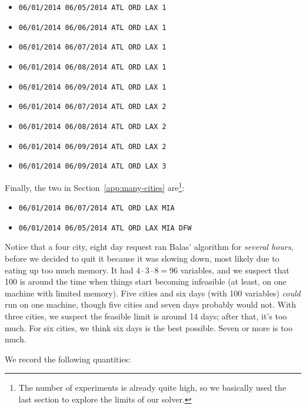 \documentclass{article}
\begin{document}
\begin{itemize}[noitemsep]
    \item \texttt{06/01/2014 06/05/2014 ATL ORD LAX 1}
    \item \texttt{06/01/2014 06/06/2014 ATL ORD LAX 1}
    \item \texttt{06/01/2014 06/07/2014 ATL ORD LAX 1}
    \item \texttt{06/01/2014 06/08/2014 ATL ORD LAX 1}
    \item \texttt{06/01/2014 06/09/2014 ATL ORD LAX 1}
    \item \texttt{06/01/2014 06/07/2014 ATL ORD LAX 2}
    \item \texttt{06/01/2014 06/08/2014 ATL ORD LAX 2}
    \item \texttt{06/01/2014 06/09/2014 ATL ORD LAX 2}
    \item \texttt{06/01/2014 06/09/2014 ATL ORD LAX 3}
\end{itemize}

Finally, the two in Section~\ref{app:many-cities} are\footnote{The number of experiments is already quite high, so we basically used the last
section to explore the limits of our solver.}:

\begin{itemize}[noitemsep]
    \item \texttt{06/01/2014 06/07/2014 ATL ORD LAX MIA}
    \item \texttt{06/01/2014 06/05/2014 ATL ORD LAX MIA DFW}
\end{itemize}

Notice that a four city, eight day request ran Balas' algorithm for \emph{several hours}, before we decided to quit it because it was slowing down,
most likely due to eating up too much memory. It had $4\cdot 3\cdot 8 = 96$ variables, and we suspect that 100 is around the time when things start
becoming infeasible (at least, on one machine with limited memory). Five cities and six days (with 100 variables) \emph{could} run on one machine,
though five cities and seven days probably would not. With three cities, we suspect the feasible limit is around 14 days; after that, it's too much.
For six cities, we think six days is the best possible. Seven or more is too much.

We record the following quantities:
\end{document}
